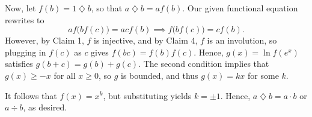 Now, let $f(b)=1\mathbin{\diamondsuit}b$, so that $a\mathbin{\diamondsuit}b=af(b)$. Our given functional equation rewrites to \[af\big(bf(c)\big)=acf(b)\implies f\big(bf(c)\big)=cf(b).\]
However, by Claim 1, $f$ is injective, and by Claim 4, $f$ is an involution, so plugging in $f(c)$ as $c$ gives $f(bc)=f(b)f(c)$. Hence, $g(x)=\ln f(e^x)$ satisfies $g(b+c)=g(b)+g(c)$. The second condition implies that $g(x)\ge -x$ for all $x\ge 0$, so $g$ is bounded, and thus $g(x)=kx$ for some $k$.

It follows that $f(x)=x^k$, but substituting yields $k=\pm 1$. Hence, $a\mathbin{\diamondsuit}b=a\cdot b$ or $a\div b$, as desired.
